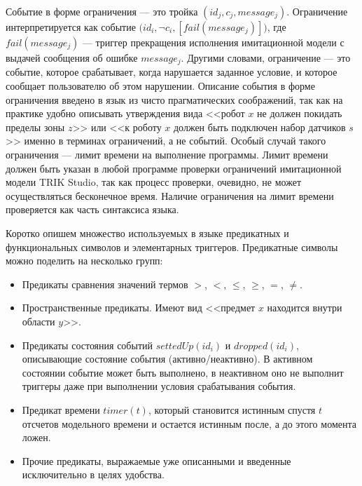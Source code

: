 \documentclass[conference]{IEEEtran}
\begin{document}
Событие в форме ограничения --- это тройка $(id_j, c_j, message_j)$. Ограничение интерпретируется как событие $(id_i, $$\neg$$c_i, [ fail(message_j) ])$, где $fail(message_j)$ --- триггер прекращения исполнения имитационной модели с выдачей сообщения об ошибке $message_j$. Другими словами, ограничение --- это событие, которое срабатывает, когда нарушается заданное условие, и которое сообщает пользователю об этом нарушении. Описание события в форме ограничения введено в язык из чисто прагматических соображений, так как на практике удобно описывать утверждения вида <<робот $x$ не должен покидать пределы зоны $z$>> или <<к роботу $x$ должен быть подключен набор датчиков $s$>> именно в терминах ограничений, а не событий. Особый случай такого ограничения --- лимит времени на выполнение программы. Лимит времени должен быть указан в любой программе проверки ограничений имитационной модели TRIK Studio, так как процесс проверки, очевидно, не может осуществляться бесконечное время. Наличие ограничения на лимит времени проверяется как часть синтаксиса языка.

Коротко опишем множество используемых в языке предикатных и функциональных символов и элементарных триггеров. Предикатные символы можно поделить на несколько групп:
\begin{itemize}
    \item Предикаты сравнения значений термов $>$, $<$, $\leq$, $\geq$, $=$, $\neq$.
    \item Пространственные предикаты. Имеют вид <<предмет $x$ находится внутри области $y$>>.
    \item Предикаты состояния событий $settedUp(id_i)$ и $dropped(id_i)$, описывающие состояние события 
            (активно/неактивно). В активном состоянии событие может быть выполнено, в неактивном оно не выполнит триггеры даже при выполнении условия срабатывания события.
    \item Предикат времени $timer(t)$, который становится истинным спустя $t$ отсчетов модельного времени и остается истинным после, а до этого момента ложен.
    \item Прочие предикаты, выражаемые уже описанными и введенные исключительно в целях удобства.
\end{itemize}
\end{document}
